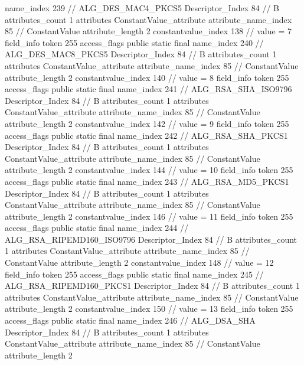 {{{{{				name_index	239		// ALG_DES_MAC4_PKCS5
				Descriptor_Index	84		// B
				attributes_count	1
				attributes {
				ConstantValue_attribute {
					attribute_name_index	85		// ConstantValue
					attribute_length	2
					constantvalue_index	138		// value = 7
				}
				}
			}
			field_info {
				token	255
				access_flags	public static final
				name_index	240		// ALG_DES_MAC8_PKCS5
				Descriptor_Index	84		// B
				attributes_count	1
				attributes {
				ConstantValue_attribute {
					attribute_name_index	85		// ConstantValue
					attribute_length	2
					constantvalue_index	140		// value = 8
				}
				}
			}
			field_info {
				token	255
				access_flags	public static final
				name_index	241		// ALG_RSA_SHA_ISO9796
				Descriptor_Index	84		// B
				attributes_count	1
				attributes {
				ConstantValue_attribute {
					attribute_name_index	85		// ConstantValue
					attribute_length	2
					constantvalue_index	142		// value = 9
				}
				}
			}
			field_info {
				token	255
				access_flags	public static final
				name_index	242		// ALG_RSA_SHA_PKCS1
				Descriptor_Index	84		// B
				attributes_count	1
				attributes {
				ConstantValue_attribute {
					attribute_name_index	85		// ConstantValue
					attribute_length	2
					constantvalue_index	144		// value = 10
				}
				}
			}
			field_info {
				token	255
				access_flags	public static final
				name_index	243		// ALG_RSA_MD5_PKCS1
				Descriptor_Index	84		// B
				attributes_count	1
				attributes {
				ConstantValue_attribute {
					attribute_name_index	85		// ConstantValue
					attribute_length	2
					constantvalue_index	146		// value = 11
				}
				}
			}
			field_info {
				token	255
				access_flags	public static final
				name_index	244		// ALG_RSA_RIPEMD160_ISO9796
				Descriptor_Index	84		// B
				attributes_count	1
				attributes {
				ConstantValue_attribute {
					attribute_name_index	85		// ConstantValue
					attribute_length	2
					constantvalue_index	148		// value = 12
				}
				}
			}
			field_info {
				token	255
				access_flags	public static final
				name_index	245		// ALG_RSA_RIPEMD160_PKCS1
				Descriptor_Index	84		// B
				attributes_count	1
				attributes {
				ConstantValue_attribute {
					attribute_name_index	85		// ConstantValue
					attribute_length	2
					constantvalue_index	150		// value = 13
				}
				}
			}
			field_info {
				token	255
				access_flags	public static final
				name_index	246		// ALG_DSA_SHA
				Descriptor_Index	84		// B
				attributes_count	1
				attributes {
				ConstantValue_attribute {
					attribute_name_index	85		// ConstantValue
					attribute_length	2
}}}}}}}
